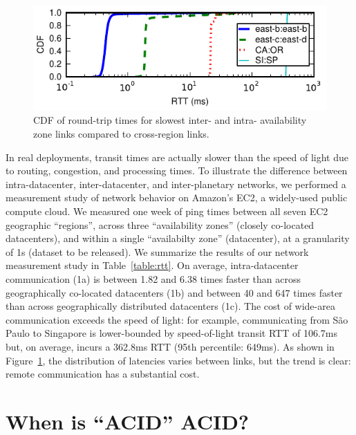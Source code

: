 \begin{figure}
\includegraphics[width=\columnwidth]{graphs/ping-plot.pdf}
\caption{CDF of round-trip times for slowest inter- and intra-
  availability zone links compared to cross-region links.}
\label{fig:rtt}
\end{figure}

In real deployments, transit times are actually slower than the speed
of light due to routing, congestion, and processing times. To
illustrate the difference between intra-datacenter, inter-datacenter,
and inter-planetary networks, we performed a measurement study of
network behavior on Amazon's EC2, a widely-used public compute
cloud. We measured one week of ping times between all seven EC2
geographic ``regions'', across three ``availability zones'' (closely
co-located datacenters), and within a single ``availabilty zone''
(datacenter), at a granularity of 1s (dataset to be released). We
summarize the results of our network measurement study in
Table~\ref{table:rtt}. On average, intra-datacenter communication (1a)
is between 1.82 and 6.38 times faster than across geographically
co-located datacenters (1b) and between 40 and 647 times faster than
across geographically distributed datacenters (1c). The cost of
wide-area communication exceeds the speed of light: for example,
communicating from S\~{a}o Paulo to Singapore is lower-bounded by
speed-of-light transit RTT of 106.7ms but, on average, incurs a
362.8ms RTT (95th percentile: 649ms). As shown in
Figure~\ref{fig:rtt}, the distribution of latencies varies between
links, but the trend is clear: remote communication has a substantial
cost.

\section{When is ``ACID'' ACID?}
\label{sec:modernacid}

